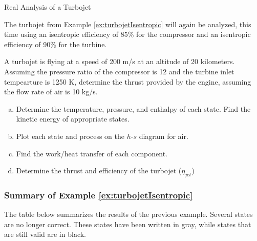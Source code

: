 \begin{example}[label=ex:turbojetReal]{Real Analysis of a Turbojet}

  The turbojet from Example \ref{ex:turbojetIsentropic} will again be analyzed, this time using an isentropic efficiency of 85\% for the compressor and an isentropic efficiency of 90\% for the turbine.

  A turbojet is flying at a speed of 200 m/s at an altitude of 20 kilometers.  Assuming the pressure ratio of the compressor is 12 and the turbine inlet tempearture is 1250 K, determine the thrust provided by the engine, assuming the flow rate of air is 10 kg/s.

  \begin{enumerate}[a)]
  \item Determine the temperature, pressure, and enthalpy of each state.  Find the kinetic energy of appropriate states.
  \item Plot each state and process on the $h$-$s$ diagram for air.
  \item Find the work/heat transfer of each component.
  \item Determine the thrust and efficiency of the turbojet ($\eta_{jet}$)
  \end{enumerate}

  \subsubsection*{Summary of Example \ref{ex:turbojetIsentropic}}
  The table below summarizes the results of the previous example.  Several states are no longer correct.  These states have been written in gray, while states that are still valid are in black.
  

\end{example}
